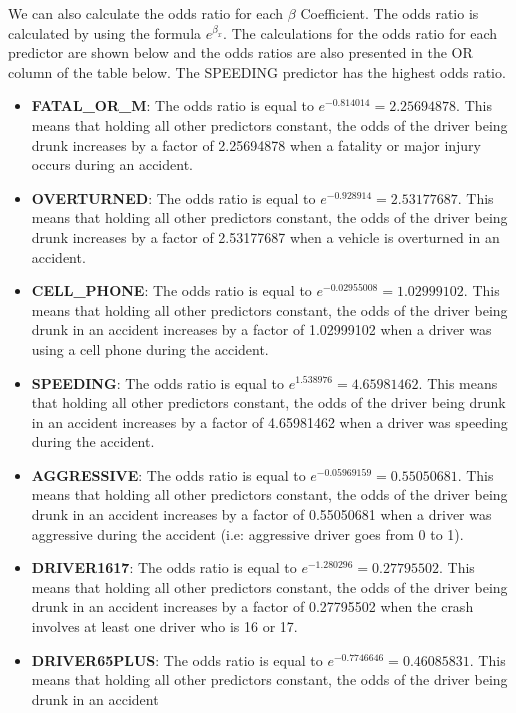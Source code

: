 \documentclass[
]{article}
\begin{document}
We can also calculate the odds ratio for each \(\beta\) Coefficient. The
odds ratio is calculated by using the formula \(e^{\beta_x}\). The
calculations for the odds ratio for each predictor are shown below and
the odds ratios are also presented in the OR column of the table below.
The SPEEDING predictor has the highest odds ratio.

\begin{itemize}
\item
  \textbf{FATAL\_OR\_M}: The odds ratio is equal to
  \(e^{-0.814014} = 2.25694878\). This means that holding all other
  predictors constant, the odds of the driver being drunk increases by a
  factor of 2.25694878 when a fatality or major injury occurs during an
  accident.
\item
  \textbf{OVERTURNED}: The odds ratio is equal to
  \(e^{-0.928914} = 2.53177687\). This means that holding all other
  predictors constant, the odds of the driver being drunk increases by a
  factor of 2.53177687 when a vehicle is overturned in an accident.
\item
  \textbf{CELL\_PHONE}: The odds ratio is equal to
  \(e^{-0.02955008} = 1.02999102\). This means that holding all other
  predictors constant, the odds of the driver being drunk in an accident
  increases by a factor of 1.02999102 when a driver was using a cell
  phone during the accident.
\item
  \textbf{SPEEDING}: The odds ratio is equal to
  \(e^{1.538976} = 4.65981462\). This means that holding all other
  predictors constant, the odds of the driver being drunk in an accident
  increases by a factor of 4.65981462 when a driver was speeding during
  the accident.
\item
  \textbf{AGGRESSIVE}: The odds ratio is equal to
  \(e^{-0.05969159} = 0.55050681\). This means that holding all other
  predictors constant, the odds of the driver being drunk in an accident
  increases by a factor of 0.55050681 when a driver was aggressive
  during the accident (i.e: aggressive driver goes from 0 to 1).
\item
  \textbf{DRIVER1617}: The odds ratio is equal to
  \(e^{-1.280296} = 0.27795502\). This means that holding all other
  predictors constant, the odds of the driver being drunk in an accident
  increases by a factor of 0.27795502 when the crash involves at least
  one driver who is 16 or 17.
\item
  \textbf{DRIVER65PLUS}: The odds ratio is equal to
  \(e^{-0.7746646} = 0.46085831\). This means that holding all other
  predictors constant, the odds of the driver being drunk in an accident

\end{itemize}
\end{document}
